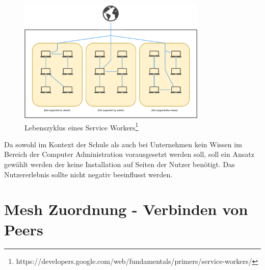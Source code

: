 \begin{figure}[!h]
	\centering
	\includegraphics[width=0.8\textwidth]{figures/mesh}
	\caption[A Figure Short-Title]{Lebenszyklus eines Service Workers\footnote{https://developers.google.com/web/fundamentals/primers/service-workers/}}
	\label{fig:mesh}
\end{figure}

Da sowohl im Kontext der Schule als auch bei Unternehmen kein Wissen im Bereich der Computer Administration vorausgesetzt werden soll, soll ein Ansatz gewählt werden der keine Installation auf Seiten der Nutzer benötigt. Das Nutzererlebnis sollte nicht negativ beeinflusst werden. 



% 
%
%
%


%
%



\section{Mesh Zuordnung - Verbinden von Peers}



